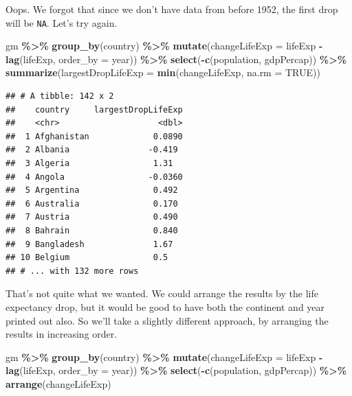 \documentclass[
]{krantz}
\newenvironment{Shaded}{\begin{snugshade}}{\end{snugshade}}
\newcommand{\DataTypeTok}[1]{\textcolor[rgb]{0.13,0.29,0.53}{#1}}
\newcommand{\KeywordTok}[1]{\textcolor[rgb]{0.13,0.29,0.53}{\textbf{#1}}}
\newcommand{\NormalTok}[1]{#1}
\newcommand{\OperatorTok}[1]{\textcolor[rgb]{0.81,0.36,0.00}{\textbf{#1}}}
\newcommand{\OtherTok}[1]{\textcolor[rgb]{0.56,0.35,0.01}{#1}}
\newcommand{\StringTok}[1]{\textcolor[rgb]{0.31,0.60,0.02}{#1}}
\begin{document}
Oops. We forgot that since we don't have data from before 1952, the first drop will be \texttt{NA}. Let's try again.

\begin{Shaded}
\begin{Highlighting}[]
\NormalTok{gm }\OperatorTok{\%\textgreater{}\%}\StringTok{ }
\StringTok{  }\KeywordTok{group\_by}\NormalTok{(country) }\OperatorTok{\%\textgreater{}\%}\StringTok{ }
\StringTok{  }\KeywordTok{mutate}\NormalTok{(}\DataTypeTok{changeLifeExp =}\NormalTok{ lifeExp }\OperatorTok{{-}}\StringTok{ }\KeywordTok{lag}\NormalTok{(lifeExp, }\DataTypeTok{order\_by =}\NormalTok{ year)) }\OperatorTok{\%\textgreater{}\%}\StringTok{ }
\StringTok{  }\KeywordTok{select}\NormalTok{(}\OperatorTok{{-}}\KeywordTok{c}\NormalTok{(population, gdpPercap)) }\OperatorTok{\%\textgreater{}\%}\StringTok{ }
\StringTok{  }\KeywordTok{summarize}\NormalTok{(}\DataTypeTok{largestDropLifeExp =} \KeywordTok{min}\NormalTok{(changeLifeExp, }\DataTypeTok{na.rm =} \OtherTok{TRUE}\NormalTok{))}
\end{Highlighting}
\end{Shaded}

\begin{verbatim}
## # A tibble: 142 x 2
##    country     largestDropLifeExp
##    <chr>                    <dbl>
##  1 Afghanistan             0.0890
##  2 Albania                -0.419 
##  3 Algeria                 1.31  
##  4 Angola                 -0.0360
##  5 Argentina               0.492 
##  6 Australia               0.170 
##  7 Austria                 0.490 
##  8 Bahrain                 0.840 
##  9 Bangladesh              1.67  
## 10 Belgium                 0.5   
## # ... with 132 more rows
\end{verbatim}

That's not quite what we wanted. We could arrange the results by the life expectancy drop, but it would be good to have both the continent and year printed out also. So we'll take a slightly different approach, by arranging the results in increasing order.

\begin{Shaded}
\begin{Highlighting}[]
\NormalTok{gm }\OperatorTok{\%\textgreater{}\%}\StringTok{ }
\StringTok{  }\KeywordTok{group\_by}\NormalTok{(country) }\OperatorTok{\%\textgreater{}\%}\StringTok{ }
\StringTok{  }\KeywordTok{mutate}\NormalTok{(}\DataTypeTok{changeLifeExp =}\NormalTok{ lifeExp }\OperatorTok{{-}}\StringTok{ }\KeywordTok{lag}\NormalTok{(lifeExp, }\DataTypeTok{order\_by =}\NormalTok{ year)) }\OperatorTok{\%\textgreater{}\%}\StringTok{ }
\StringTok{  }\KeywordTok{select}\NormalTok{(}\OperatorTok{{-}}\KeywordTok{c}\NormalTok{(population, gdpPercap)) }\OperatorTok{\%\textgreater{}\%}\StringTok{ }
\StringTok{  }\KeywordTok{arrange}\NormalTok{(changeLifeExp)}
\end{Highlighting}
\end{Shaded}
\end{document}

